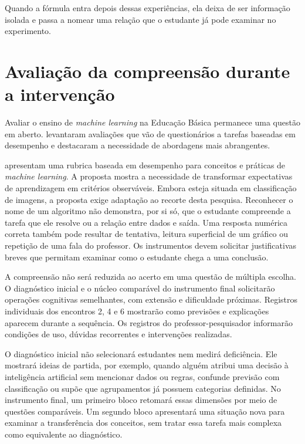 Quando a fórmula entra depois dessas experiências, ela deixa de ser informação isolada e passa a nomear uma relação que o estudante já pode examinar no experimento.

\section{Avaliação da compreensão durante a intervenção}

Avaliar o ensino de \textit{machine learning} na Educação Básica permanece uma questão em aberto.  levantaram avaliações que vão de questionários a tarefas baseadas em desempenho e destacaram a necessidade de abordagens mais abrangentes.

 apresentam uma rubrica baseada em desempenho para conceitos e práticas de \textit{machine learning}. A proposta mostra a necessidade de transformar expectativas de aprendizagem em critérios observáveis. Embora esteja situada em classificação de imagens, a proposta exige adaptação ao recorte desta pesquisa. Reconhecer o nome de um algoritmo não demonstra, por si só, que o estudante compreende a tarefa que ele resolve ou a relação entre dados e saída. Uma resposta numérica correta também pode resultar de tentativa, leitura superficial de um gráfico ou repetição de uma fala do professor. Os instrumentos devem solicitar justificativas breves que permitam examinar como o estudante chega a uma conclusão.

A compreensão não será reduzida ao acerto em uma questão de múltipla escolha. O diagnóstico inicial e o núcleo comparável do instrumento final solicitarão operações cognitivas semelhantes, com extensão e dificuldade próximas. Registros individuais dos encontros 2, 4 e 6 mostrarão como previsões e explicações aparecem durante a sequência. Os registros do professor-pesquisador informarão condições de uso, dúvidas recorrentes e intervenções realizadas.

O diagnóstico inicial não selecionará estudantes nem medirá deficiência. Ele mostrará ideias de partida, por exemplo, quando alguém atribui uma decisão à inteligência artificial sem mencionar dados ou regras, confunde previsão com classificação ou supõe que agrupamentos já possuem categorias definidas. No instrumento final, um primeiro bloco retomará essas dimensões por meio de questões comparáveis. Um segundo bloco apresentará uma situação nova para examinar a transferência dos conceitos, sem tratar essa tarefa mais complexa como equivalente ao diagnóstico.

